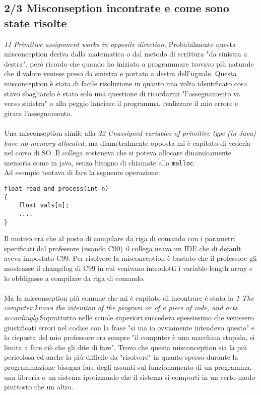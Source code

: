 \documentclass[a4paper]{article}
\begin{document}
\subsection{2/3 Misconseption incontrate e come sono state risolte}
\textit{11 Primitive assignment works in opposite direction.}
Probabilmente questa misconception deriva dalla matematica o dal metodo di scrittura "da sinistra a destra", però ricordo che quando ho iniziato a programmare trovavo più naturale che il valore venisse preso da sinistra e portato a destra dell'uguale.
Questa misconception è stata di facile risoluzione in quanto una volta identificato cosa stavo sbagliando è stato solo una questione di ricordarmi "l'assegnamento va verso sinistra" o alla peggio lanciare il programma, realizzare il mio errore e girare l'assegnamento.\\\\
Una misconseption simile alla \textit{22 Unassigned variables of primitive type (in Java) have no memory allocated.} ma diametralmente opposta mi è capitato di vederla nel corso di SO. Il collega sosteneva che si poteva allocare dinamicamente memoria come in java, senza bisogno di chiamate alla \texttt{malloc}.\\
Ad esempio tentava di fare la seguente operazione: 
\begin{lstlisting}
float read_and_process(int n)
{
    float vals[n];
    ....
}
\end{lstlisting}
Il motivo era che al posto di compilare da riga di comando con i parametri specificati dal professore (usando C90) il collega usava un IDE che di default aveva impostato C99. Per risolvere la misconception è bastato che il professore gli mostrasse il changelog di C99 in cui venivano introdotti i variable-length array e lo obbligasse a compilare da riga di comando.\\\\
Ma la misconseption più comune che mi è capitato di incontrare è stata la \textit{1 The computer knows the intention of the program or of a piece of code, and acts accordingly}.Soprattutto nelle scuole superiori succedeva spessissimo che venissero giustificati errori nel codice con la frase "si ma io ovviamente intendevo questo" e la risposta del mio professore era sempre "il computer è una macchina stupida, si limita a fare ciò che gli dite di fare".
Trovo che questa misconception sia la più pericolosa ed anche la più difficile da "risolvere" in quanto spesso durante la programmazione bisogna fare degli assunti sul funzionamento di un programma, una libreria o un sistema ipotizzando che il sistema si comporti in un certo modo piuttosto che un altro.
\end{document}
